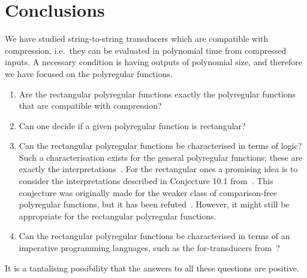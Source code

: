 \documentclass{article}
\begin{document}





\section{Conclusions}
We have studied string-to-string transducers which are compatible with compression, i.e.~they can be evaluated in polynomial time from compressed inputs. A necessary condition is having outputs of polynomial size, and therefore we have focused on the polyregular functions. 

\begin{enumerate}
    \item Are the rectangular polyregular functions exactly the polyregular functions that are compatible with compression? 
    \item Can one decide if a given polyregular function is rectangular?
    \item Can the rectangular polyregular functions be characterised in terms of logic? Such a characterisation exists for the  general polyregular functions; these  are exactly the \mso interpretations~\cite[Theorem 7]{msoInterpretations}. For the rectangular ones a promising idea is to consider the interpretations described in Conjecture 10.1 from~\cite{NguyenNP21}. This conjecture was originally made for the weaker class of comparison-free polyregular functions, but it has been refuted~\cite[Theorem 4.6]{kiefer2023refutations}. However, it might still be appropriate for the rectangular polyregular functions.
    \item  Can the rectangular polyregular functions be characterised in terms of an  imperative programming languages, such as the for-transducers from~\cite[Section 1]{polyregular-survey}?
\end{enumerate}
It is a tantalising possibility that the answers to all these questions are positive.



\end{document}
